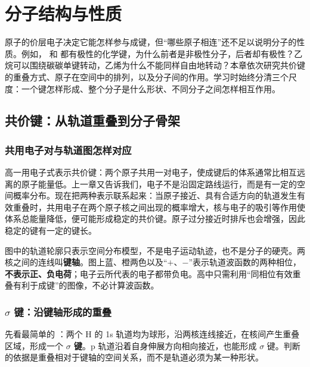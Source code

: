 \newcommand{\csevenpupper}[1]{(#1,0)..controls({#1-.65},.3)and({#1-.65},1.05)..(#1,1.2)..controls({#1+.65},1.05)and({#1+.65},.3)..cycle}
\chapter{分子结构与性质}

原子的价层电子决定它能怎样参与成键，但“哪些原子相连”还不足以说明分子的性质。例如， 和  都有极性的化学键，为什么前者是非极性分子，后者却有极性？乙烷可以围绕碳碳单键转动，乙烯为什么不能同样自由地转动？本章依次研究共价键的重叠方式、原子在空间中的排列，以及分子间的作用。学习时始终分清三个尺度：一个键怎样形成、整个分子是什么形状、不同分子之间怎样相互作用。

\section{共价键：从轨道重叠到分子骨架}

\subsection{共用电子对与轨道图怎样对应}
高一用电子式表示共价键：两个原子共用一对电子，使成键后的体系通常比相互远离的原子能量低。上一章又告诉我们，电子不是沿固定路线运行，而是有一定的空间概率分布。现在把两种表示联系起来：当原子接近、具有合适方向的轨道发生有效重叠时，共用电子在两个原子核之间出现的概率增大，核与电子的吸引等作用使体系总能量降低，便可能形成稳定的共价键。原子过分接近时排斥也会增强，因此稳定的键有一定的键长。

图中的轨道轮廓只表示空间分布模型，不是电子运动轨迹，也不是分子的硬壳。两核之间的连线叫\textbf{键轴}。图上蓝、橙两色以及“$+$、$-$”表示轨道波函数的两种相位，\textbf{不表示正、负电荷}；电子云所代表的电子都带负电。高中只需利用“同相位有效重叠有利于成键”的图像，不必计算波函数。

\subsection{$\sigma$ 键：沿键轴形成的重叠}
先看最简单的 ：两个 H 的 1s 轨道均为球形，沿两核连线接近，在核间产生重叠区域，形成一个 \textbf{$\sigma$ 键}。p 轨道沿着自身伸展方向相向接近，也能形成 $\sigma$ 键。判断的依据是重叠相对于键轴的空间关系，而不是轨道必须为某一种形状。

